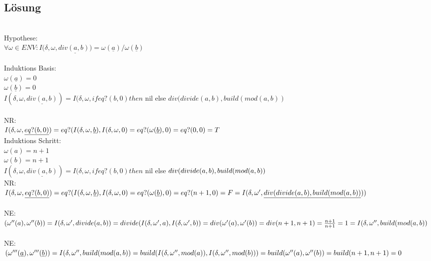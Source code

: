 \documentclass[12pt,runningheads,a4paper]{llncs}
\begin{document}
\subsection*{Lösung}
\\
Hypothese:\\
$\forall \omega \in ENV: I(\delta, \omega, \underline{div(a,b))} = \omega(\underline{a})/\omega(\underline{b}) $
\\
\\
Induktions Basis:\\
$\omega(\underline{a}) = 0$\\
$\omega(\underline{b}) = 0$\\
$I(\delta, \omega, \underline{div(a,b)}) = I(\delta,\omega, if eq?(b,0) then$ nil else $ div(divide(a,b), build(mod(a,b))$\\
\\
NR: \\
$I(\delta, \omega, \underline{eq?(b,0)}) = eq?(I(\delta, \omega, \underline{b}), I(\delta, \omega, 0) \\
= eq?(\omega(\underline{b}),0)  \\
= eq?(0,0) \\
=T \\ $
\\
Induktions Schritt:\\
$\omega(a) = n+1 $ \\
$\omega(b) = n+1 $ \\
$I(\delta, \omega, \underline{div(a,b)}) = I(\delta,\omega, if     eq?(b,0) then$ nil else $div(divide(a,b), build(mod(a,b))\\$
\\
NR:\\
$I(\delta, \omega, \underline{eq?(b,0)}) = eq?(I(\delta, \omega, \underline{b}), I(\delta, \omega, 0) \\
= eq?(\omega(\underline{b}),0)  \\
= eq?(n+1,0) \\
=F \\
\\
= I(\delta, \omega', \underline{div(divide(a,b),build(mod(a,b))}))$\\
\\
NE:\\
$(\omega''(a),\omega''(b)) = I(\delta, \omega', divide(a,b)) = divide(I(\delta, \omega', a), I(\delta, \omega', b)) \\
= div(\omega'(a), \omega'(b))\\
= div(n+1, n+1)\\
= \frac{n+1}{n+1} = 1 \\
\\
=I(\delta, \omega'', build(mod(a,b))$\\
\\
NE:\\
$(\omega'''(\underline{a}),\omega'''(\underline{b})) = I(\delta, \omega'', build(mod(a,b)) \\
= build(I(\delta, \omega'', mod(a)), I(\delta, \omega'', mod(b)))\\
= build(\omega''(a), \omega''(b))\\
= build (n+1, n+1)\\
= 0$\\
\end{document}
